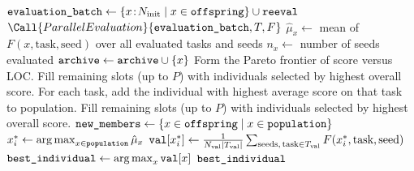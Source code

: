 \documentclass[10pt]{article}
\newcommand{\name}[1]{\textnormal{\texttt{#1}}}
\begin{document}
\begin{algorithm}[H]
\begin{algorithmic}[1]
    \EndIf
    \State $\name{evaluation\_batch} \gets \{x\!:\!N_{\mathrm{init}}\mid x\in\name{offspring}\}\cup\name{reeval}$ 
    \State $\Call{ParallelEvaluation}{\name{evaluation\_batch},T,F}$
    \For{$x\in\name{evaluation\_batch}$} 
        \State $\hat\mu_x \gets$ mean of $F(x,\text{task},\text{seed})$ over all evaluated tasks and seeds
        \State $n_x \gets$ number of seeds evaluated
        \State $\name{archive} \gets \name{archive}\cup\{x\}$
    \EndFor
     
        \State Form the Pareto frontier of score versus LOC.
        \State Fill remaining slots (up to $P$) with individuals selected by highest overall score.
    \Else {}
        \State For each task, add the individual with highest average score on that task to population.
        \State Fill remaining slots (up to $P$) with individuals selected by highest overall score.
    \EndIf
    \State $\name{new\_members} \gets \{x\in\name{offspring}\mid x\in\name{population}\}$
    \State $x^*_i \gets \operatorname*{arg\,max}_{x\in\name{population}}\hat\mu_x$ 
    \State $\name{val}[x^*_i] \gets \frac{1}{N_{\mathrm{val}}|T_{\mathrm{val}}|}\sum_{\text{seeds},\,\text{task}\in T_{\mathrm{val}}} F(x^*_i,\text{task},\text{seed})$
\EndFor
\State $\name{best\_individual} \gets \operatorname*{arg\,max}_{x}\name{val}[x]$
\State \Return $\name{best\_individual}$
\end{algorithmic}
\end{algorithm}
\end{document}
